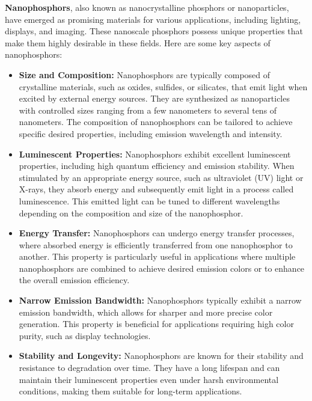 \documentclass[../introduction.tex]{subfiles}
\begin{document}
    \textbf{Nanophosphors}, also known as nanocrystalline phosphors or nanoparticles, have emerged as 
    promising materials for various applications, including lighting, displays, and imaging. 
    These nanoscale phosphors possess unique properties that make them highly desirable in 
    these fields. Here are some key aspects of nanophosphors\cite{b8}:

    \begin{itemize}
        \item \textbf{Size and Composition: } Nanophosphors are typically composed of crystalline materials, 
        such as oxides, sulfides, or silicates, that emit light when excited by external energy sources. 
        They are synthesized as nanoparticles with controlled sizes ranging from a few nanometers to several 
        tens of nanometers. The composition of nanophosphors can be tailored to achieve specific desired 
        properties, including emission wavelength and intensity.

        \item \textbf{Luminescent Properties: } Nanophosphors exhibit excellent luminescent properties, 
        including high quantum efficiency and emission stability. When stimulated by an appropriate energy 
        source, such as ultraviolet (UV) light or X-rays, they absorb energy and subsequently emit light in a 
        process called luminescence. This emitted light can be tuned to different wavelengths depending on the 
        composition and size of the nanophosphor.

        \item \textbf{Energy Transfer:} Nanophosphors can undergo energy transfer processes, where absorbed 
        energy is efficiently transferred from one nanophosphor to another. This property is particularly 
        useful in applications where multiple nanophosphors are combined to achieve desired emission colors 
        or to enhance the overall emission efficiency.

        \item \textbf{Narrow Emission Bandwidth: } Nanophosphors typically exhibit a narrow emission 
        bandwidth, which allows for sharper and more precise color generation. This property is beneficial 
        for applications requiring high color purity, such as display technologies.

        \item \textbf{Stability and Longevity: } Nanophosphors are known for their stability and resistance 
        to degradation over time. They have a long lifespan and can maintain their luminescent properties 
        even under harsh environmental conditions, making them suitable for long-term applications.


\end{itemize}
\end{document}

